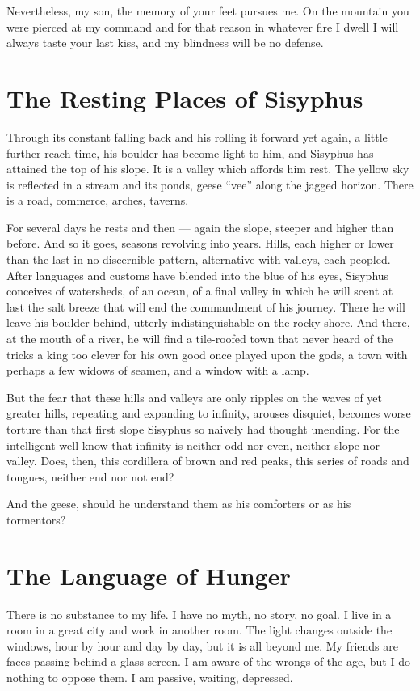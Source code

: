 \documentclass[english,11pt,letterpaper,onecolumn]{scrbook}
\begin{document}
	Nevertheless, my son, the memory of your feet pursues me.  On the mountain you were pierced at my command and for that reason in whatever fire I dwell I will always taste your last kiss, and my blindness will be no defense.

\newpage
\section{The Resting Places of Sisyphus}
	Through its constant falling back and his rolling it forward yet again, a little further reach time, his boulder has become light to him, and Sisyphus has attained the top of his slope.  It is a valley which affords him rest.  The yellow sky is reflected in a stream and its ponds, geese ``vee'' along the jagged horizon.  There is a road, commerce, arches, taverns.

	For several days he rests and then --- again the slope, steeper and higher than before.  And so it goes, seasons revolving into years.  Hills, each higher or lower than the last in no discernible pattern, alternative with valleys, each peopled.  After languages and customs have blended into the blue of his eyes, Sisyphus conceives of watersheds, of an ocean, of a final valley in which he will scent at last the salt breeze that will end the commandment of his journey.  There he will leave his boulder behind, utterly indistinguishable on the rocky shore.  And there, at the mouth of a river, he will find a tile-roofed town that never heard of the tricks a king too clever for his own good once played upon the gods, a town with perhaps a few widows of seamen, and a window with a lamp.

	But the fear that these hills and valleys are only ripples on the waves of yet greater hills, repeating and expanding to infinity, arouses disquiet, becomes worse torture than that first slope Sisyphus so naively had thought unending.  For the intelligent well know that infinity is neither odd nor even, neither slope nor valley.  Does, then, this cordillera of brown and red peaks, this series of roads and tongues, neither end nor not end?

	And the geese, should he understand them as his comforters or as his tormentors?

\newpage
\section{The Language of Hunger}
	There is no substance to my life.  I have no myth, no story, no goal.  I live in a room in a great city and work in another room.  The light changes outside the windows, hour by hour and day by day, but it is all beyond me.  My friends are faces passing behind a glass screen.  I am aware of the wrongs of the age, but I do nothing to oppose them.  I am passive, waiting, depressed.
\end{document}

